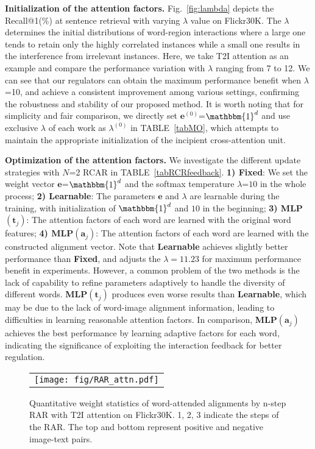 \documentclass[journal]{IEEEtran}\newcommand{\ignore}[1]{}
\begin{document}
\textbf{Initialization of the attention factors.}
Fig.~\ref{fig:lambda} depicts the Recall@1(\%) at sentence retrieval with varying $\lambda$ value on Flickr30K. The $\lambda$ determines the initial distributions of word-region interactions where a large one tends to retain only the highly correlated instances while a small one results in the interference from irrelevant instances. Here, we take T2I attention as an example and compare the performance variation with $\lambda$ ranging from 7 to 12. We can see that our regulators can obtain the maximum performance benefit when $\lambda$=10, and achieve a consistent improvement among various settings, confirming the robustness and stability of our proposed method. It is worth noting that for simplicity and fair comparison, we directly set $\mathbf{e}^{(0)}$=$\mathbbm{1}^{d}$ and use exclusive $\lambda$ of each work as $\lambda^{(0)}$ in TABLE~\ref{tabMO}, which attempts to maintain the appropriate initialization of the incipient cross-attention unit.

\textbf{Optimization of the attention factors.} We investigate the different update strategies with $N$=2 RCAR in TABLE~\ref{tabRCRfeedback}. \textbf{1) Fixed}: We set the weight vector $\boldsymbol{e}$=$\mathbbm{1}^{d}$ and the softmax temperature $\lambda$=$10$ in the whole process; \textbf{2) Learnable}: The parameters $\boldsymbol{e}$ and $\lambda$ are learnable during the training, with initialization of $\mathbbm{1}^{d}$ and $10$ in the beginning; \textbf{3) MLP$(\boldsymbol{t}_j)$}: The attention factors of each word are learned with the original word features; \textbf{4) MLP$(\boldsymbol{a}_{j})$}: The attention factors of each word are learned with the constructed alignment vector. Note that \textbf{Learnable} achieves slightly better performance than \textbf{Fixed}, and adjusts the $\lambda=11.23$ for maximum performance benefit in experiments. However, a common problem of the two methods is the lack of capability to refine parameters adaptively to handle the diversity of different words.
\textbf{MLP$(\boldsymbol{t}_{j})$} produces even worse results than \textbf{Learnable}, which may be due to the lack of word-image alignment information, leading to difficulties in learning reasonable attention factors. In comparison, \textbf{MLP$(\boldsymbol{a}_{j})$} achieves the best performance by learning adaptive factors for each word, indicating the significance of exploiting the interaction feedback for better regulation.

\begin{figure}[t!]
	\centering
	\begin{tabular}{@{}c}
		\texttt{[image: fig/RAR\_attn.pdf]} 
	\end{tabular}
	\caption{Quantitative weight statistics of word-attended alignments by n-step RAR with T2I attention on Flickr30K. 1, 2, 3 indicate the steps of the RAR. The top and bottom represent positive and negative image-text pairs.}
	\label{fig:RARattn}
\end{figure}
\end{document}
